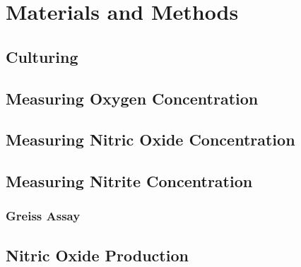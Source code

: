 \chapter{Materials and Methods}
\section{Culturing \Nsm}
\section{Measuring Oxygen Concentration}
\section{Measuring Nitric Oxide Concentration}
\section{Measuring Nitrite Concentration}
\subsection{Greiss Assay}
\section{Nitric Oxide Production}